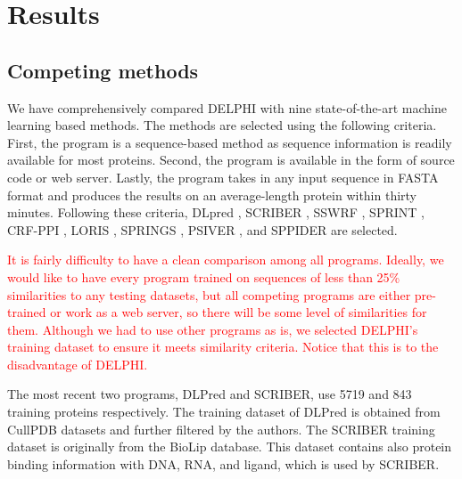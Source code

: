 \documentclass{bioinfo}
\newcommand{\myColor}{red}
\begin{document}
\section{Results}
\subsection{Competing methods}
We have comprehensively compared DELPHI with nine state-of-the-art machine learning based methods. The methods are selected using the following criteria. First, the program is a sequence-based method as sequence information is readily available for most proteins. Second, the program is available in the form of source code or web server. Lastly, the program takes in any input sequence in FASTA format and produces the results on an average-length protein within thirty minutes. Following these criteria, DLpred \citep{zhang2019sequence}, SCRIBER \citep{zhang2019scriber}, SSWRF \citep{wei2016protein}, SPRINT \citep{taherzadeh2016sequence}, CRF-PPI \citep{wei2015cascade}, LORIS \citep{dhole2014sequence}, SPRINGS \citep{singh2014springs}, PSIVER \citep{murakami2010applying}, and SPPIDER \citep{porollo2007prediction} are selected.

\textcolor{\myColor}{It is fairly difficulty to have a clean comparison among all programs. Ideally, we would like to have every program trained on sequences of less than 25\% similarities to any testing datasets, but all competing programs are either pre-trained or work as a web server, so there will be some level of similarities for them. Although we had to use other programs as is, we selected DELPHI's training dataset to ensure it meets similarity criteria. Notice that this is to the disadvantage of DELPHI.}

 The most recent two programs, DLPred and SCRIBER, use 5719 and 843 training proteins respectively. The training dataset of DLPred is obtained from CullPDB datasets \citep{wang2003pisces} and further filtered by the authors. The SCRIBER training dataset is originally from the BioLip database. This dataset contains also protein binding information with DNA, RNA, and ligand, which is used by SCRIBER.
\end{document}
